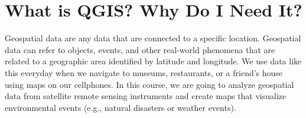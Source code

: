 \documentclass[oneside,a4paper,11pt,explicit]{book}
\begin{document}
\fancyhead{}

\section{What is QGIS? Why Do I Need It?}

Geospatial data are any data that are connected to a specific location. Geospatial data can refer to objects, events, and other real-world phenomena that are related to a geographic area identified by latitude and longitude. We use data like this everyday when we navigate to museums, restaurants, or a friend's house using maps on our cellphones. In this course, we are going to analyze geospatial data from satellite remote sensing instruments and create maps that visualize environmental events (e.g., natural disasters or weather events). 
\end{document}
